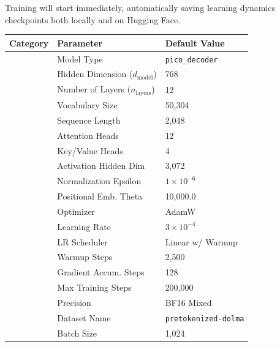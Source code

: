 {Training will start immediately, automatically saving learning dynamics checkpoints both locally and on Hugging Face.


\begin{table}[h!]
    \centering
    \renewcommand{\arraystretch}{1.2} %
    \setlength{\tabcolsep}{8pt} %
    \footnotesize
    \begin{tabular}{|>{\centering\arraybackslash}p{3cm}|p{5cm}|p{5.5cm}|}
        \hline
        \textbf{Category} & \textbf{Parameter} & \textbf{Default Value} \\
        \hline
        \multirow{10}{*}{\textbf{Model}}  
            & Model Type & \texttt{pico\_decoder} \\
            & Hidden Dimension ($d_{\text{model}}$) & 768 \\
            & Number of Layers ($n_{\text{layers}}$) & 12 \\
            & Vocabulary Size & 50,304 \\
            & Sequence Length & 2,048 \\
            & Attention Heads & 12 \\
            & Key/Value Heads & 4 \\
            & Activation Hidden Dim & 3,072 \\
            & Normalization Epsilon & $1 \times 10^{-6}$ \\
            & Positional Emb. Theta & 10,000.0 \\
        \hline
        \multirow{7}{*}{\textbf{Training}}  
            & Optimizer & AdamW \\
            & Learning Rate & $3 \times 10^{-4}$ \\
            & LR Scheduler & Linear w/ Warmup \\
            & Warmup Steps & 2,500 \\
            & Gradient Accum. Steps & 128 \\
            & Max Training Steps & 200,000 \\
            & Precision & BF16 Mixed \\
        \hline
        \multirow{3}{*}{\textbf{Data}}  
            & Dataset Name & \texttt{pretokenized-dolma} \\
            & Batch Size & 1,024 \\

\end{tabular}
\end{table}}
